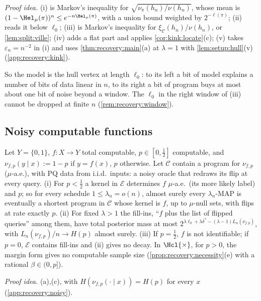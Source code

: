 \emph{Proof idea.} (i) is Markov's inequality for $\sqrt{\nu_\pi(h_n)/\nu(h_n)}$, whose mean is $(1-{\Hel}_\mu(\pi))^n\le e^{-n{\Hel}_\mu(\pi)}$, with a union bound weighted by $2^{-\ell(\pi)}$; (ii) reads it below $\ell_0$; (iii) is Markov's inequality for $\xi_{\mathcal C}(h_n)/\nu(h_n)$, or \cref{lem:split:ville}; (iv) adds a flat part and applies \cref{cor:kink:locate}(c); (v) takes $\varepsilon_n=n^{-2}$ in (i) and uses \cref{thm:recovery:main}(a) at $\lambda=1$ with \cref{lem:setup:hull}(v) (\cref{app:recovery:kink}).

So the model is the hull vertex at length $\ell_0$: to its left a bit of model explains a number of bits of data linear in $n$, to its right a bit of program buys at most about one bit of noise beyond a window. The $\ell_0$ in the right window of (iii) cannot be dropped at finite $n$ (\cref{rem:recovery:window}).

\subsection{Noisy computable functions}\label{sec:recovery:noisy}

\begin{corollary}\label{cor:recovery:noisy}
Let $Y=\{0,1\}$, $f:X\to Y$ total computable, $p\in[0,\frac12]$ computable, and $\nu_{f,p}(y\mid x):=1-p$ if $y=f(x)$, $p$ otherwise. Let $\mathcal C$ contain a program for $\nu_{f,p}$ ($\mu$-a.e.), with PQ data from i.i.d.\ inputs: a noisy oracle that redraws its flip at every query.
(i) For $p<\frac12$ a kernel in $\mathcal E$ determines $f$ $\mu$-a.e.\ (its more likely label) and $p$; so for every schedule $1\le\lambda_n=o(n)$, almost surely every $\lambda_n$-MAP is eventually a shortest program in $\mathcal C$ whose kernel is $f$, up to $\mu$-null sets, with flips at rate exactly $p$.
(ii) For fixed $\lambda>1$ the fill-ins, ``$f$ plus the list of flipped queries'' among them, have total posterior mass at most $2^{\lambda\ell_0+\lambda\delta^*-(\lambda-1)L_n(\nu_{f,p})}$, with $L_n(\nu_{f,p})/n\to H(p)$ almost surely.
(iii) If $p=\frac12$, $f$ is not identifiable; if $p=0$, $\mathcal E$ contains fill-ins and (ii) gives no decay. In $\Hcl{\times}$, for $p>0$, the margin form gives no computable sample size (\cref{prop:recovery:necessity}(e) with a rational $\beta\in(0,p]$).
\end{corollary}

\emph{Proof idea.} (a),(c), with $H(\nu_{f,p}(\cdot\mid x))=H(p)$ for every $x$ (\cref{app:recovery:noisy}).

